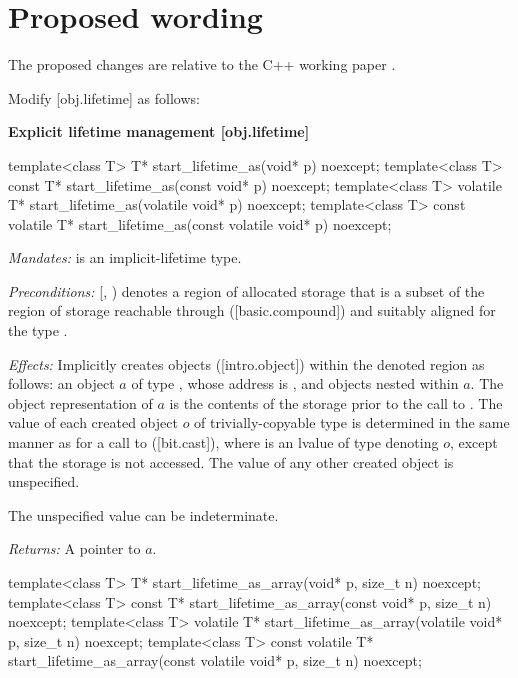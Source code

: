 \section{Proposed wording}
\label{sec:wording}

The proposed changes are relative to the C++ working paper \cite{N4917}.

Modify [obj.lifetime] as follows:

\textbf{Explicit lifetime management \hspace{83mm}[obj.lifetime]}

\begin{codeblock}
template<class T>
  T* start_lifetime_as(void* p) noexcept;
template<class T>
  const T* start_lifetime_as(const void* p) noexcept;
template<class T>
  volatile T* start_lifetime_as(volatile void* p) noexcept;
template<class T>
  const volatile T* start_lifetime_as(const volatile void* p) noexcept;
\end{codeblock}

\begin{adjustwidth}{0.5cm}{0.5cm}
\emph{Mandates:}  is an implicit-lifetime type.

\emph{Preconditions:} [, ) denotes a region of allocated storage that is a subset of the region of storage reachable through ([basic.compound])  and suitably aligned for the type .

\emph{Effects:} Implicitly creates objects ([intro.object]) within the denoted region as follows: an object $a$ of type , whose address is , and objects nested within $a$. The object representation of $a$ is the contents of the storage prior to the call to . The value of each created object $o$ of trivially-copyable type  is determined in the same manner as for a call to  ([bit.cast]), where  is an lvalue of type  denoting $o$, except that the storage is not accessed. The value of any other created object is unspecified. \begin{note}The unspecified value can be indeterminate.\end{note}

\emph{Returns:} A pointer to $a$.
\end{adjustwidth}

\begin{codeblock}
template<class T>
  T* start_lifetime_as_array(void* p, size_t n) noexcept;
template<class T>
  const T* start_lifetime_as_array(const void* p, size_t n) noexcept;
template<class T>
  volatile T* start_lifetime_as_array(volatile void* p, size_t n) noexcept;
template<class T>
  const volatile T* start_lifetime_as_array(const volatile void* p, size_t n) noexcept;
\end{codeblock}

